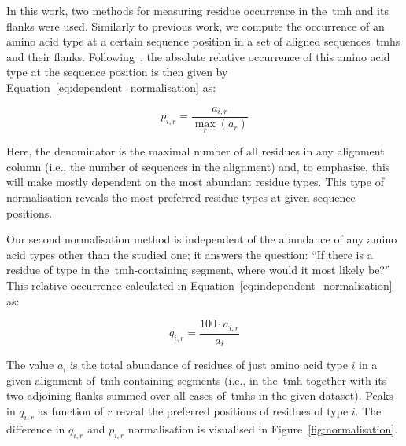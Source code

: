 In this work, two methods for measuring residue occurrence in the~\gls{tmh} and its flanks were used.
Similarly to previous work, we compute the occurrence  of an amino acid type  at a certain sequence position  in a set of aligned sequences~\gls{tmh}s and their flanks.
Following~\cite{Sharpe2010}, the absolute relative occurrence  of this amino acid type at the sequence position  is then given by Equation~\ref{eq:dependent_normalisation} as:

\begin{equation} \label{eq:dependent_normalisation}
  p_{i,r}=\frac{a_{i,r}}{\underset{r}{\max}{(a_r)}}
\end{equation}


Here, the denominator is the maximal number of all residues in any alignment column (i.e., the number of sequences in the alignment) and, to emphasise, this will make  mostly dependent on the most abundant residue types.
This type of normalisation reveals the most preferred residue types at given sequence positions.

Our second normalisation method is independent of the abundance of any amino acid types other than the studied one; it answers the question: ``If there is a residue of type  in the~\gls{tmh}-containing segment, where would it most likely be?'' This relative occurrence  calculated in Equation~\ref{eq:independent_normalisation} as:

 \begin{equation} \label{eq:independent_normalisation}
   q_{i,r}=\frac{{100}\cdot{a_{i,r}}}{a_i}
 \end{equation}

The value $a_i$ is the total abundance of residues of just amino acid type $i$ in a given alignment of~\gls{tmh}-containing segments (i.e., in the~\gls{tmh} together with its two adjoining flanks summed over all cases of~\gls{tmh}s in the given dataset).
Peaks in $q_{i,r}$ as function of $r$ reveal the preferred positions of residues of type $i$.
The difference in $q_{i,r}$ and $p_{i,r}$ normalisation is visualised in Figure~\ref{fig:normalisation}.


